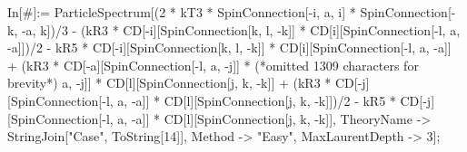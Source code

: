 In[#]:= ParticleSpectrum[(2 * kT3 * SpinConnection[-i, a, i] * SpinConnection[-k, -a, k])/3 - (kR3 * CD[-i][SpinConnection[k, l, -k]] * CD[i][SpinConnection[-l, a, -a]])/2 - kR5 * CD[-i][SpinConnection[k, l, -k]] * CD[i][SpinConnection[-l, a, -a]] + (kR3 * CD[-a][SpinConnection[-l, a, -j]] * (*omitted 1309 characters for brevity*) a, -j]] * CD[l][SpinConnection[j, k, -k]] + (kR3 * CD[-j][SpinConnection[-l, a, -a]] * CD[l][SpinConnection[j, k, -k]])/2 - kR5 * CD[-j][SpinConnection[-l, a, -a]] * CD[l][SpinConnection[j, k, -k]], TheoryName -> StringJoin["Case", ToString[14]], Method -> "Easy", MaxLaurentDepth -> 3];
